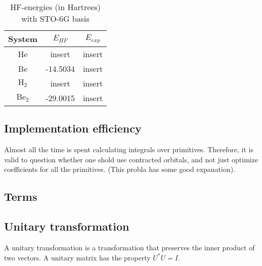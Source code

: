 \documentclass[a4paper,10pt, twocolumn, pre]{revtex4}
\begin{document}
\begin{table}[h!tb]
\caption{HF-energies (in Hartrees) with STO-6G basis}
\begin{tabular}[c]{c|c|c}
System & $E_{HF}$ & $E_{exp}$ \\
\hline
He & insert & insert \\
Be & -14.5034 & insert \\
$\mbox{H}_2$ & insert & insert \\
$\mbox{Be}_2$ & -29.0015 & insert \\
\end{tabular}
\end{table}

\begin{table}[h!tb]

\end{table}

\subsection{Implementation efficiency}
Almost all the time is spent calculating integrals over primitives. Therefore, it is valid to question whether one shold use contracted orbitals, and not just optimize coefficients for all the primitives. (This probla has some good expanation).



\begin{appendices}
\section{Terms}
\subsection{Unitary transformation}
A unitary transformation is a transformation that preserves the inner product of two vectors. A unitary matrix has the property $U^*U = I$. 

\end{appendices}



\end{document}
